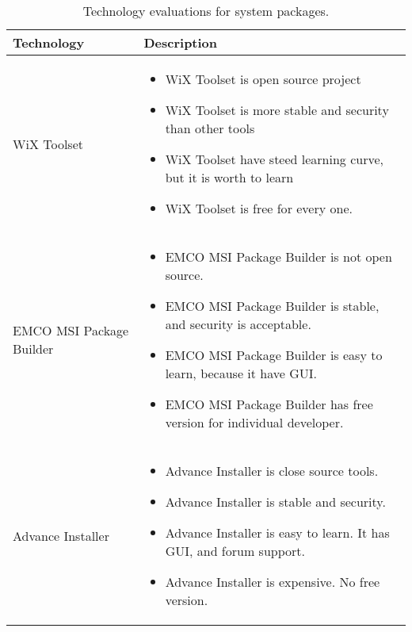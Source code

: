 \begin{table}[H]
  \begin{center}
      \begin{tabular}{ | l | p{10cm} |}
        \hline
        Technology & Description  \\ \hline
        WiX Toolset \cite{Wix_tool} &
        \begin{itemize}
          \item WiX Toolset is open source project 
          \item WiX Toolset is more stable and security than other tools
          \item WiX Toolset have steed learning curve, but it is worth to learn
          \item WiX	Toolset is free for every one.
        \end{itemize} \\ \hline

        EMCO MSI Package Builder \cite{EMCO_MSI} &
        \begin{itemize}
          \item EMCO MSI Package Builder is not open source.
          \item EMCO MSI Package Builder is stable, and security is acceptable.
          \item EMCO MSI Package Builder is easy to learn, because it have GUI.
          \item EMCO MSI Package Builder has free version for individual developer.
        \end{itemize} \\ \hline

        Advance Installer \cite{advanced_install} &
        \begin{itemize}
          \item Advance Installer is close source tools.
          \item Advance Installer is stable and security.
          \item Advance Installer is easy to learn. It has GUI, and forum support.
          \item Advance Installer is expensive. No free version.
        \end{itemize} \\ \hline
      \end{tabular}
  \end{center}
  \caption{Technology evaluations for system packages.}
\end{table}

